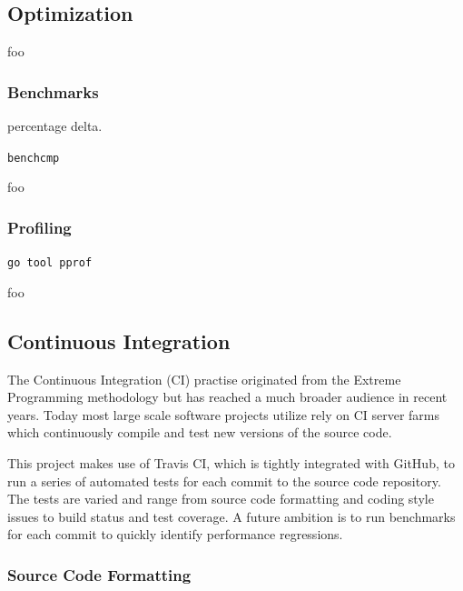 \documentclass[12pt, a4paper]{article}
\begin{document}
\subsection{Optimization}

foo

\subsubsection{Benchmarks}

percentage delta.

\texttt{benchcmp}

foo

\subsubsection{Profiling}



\texttt{go tool pprof}

foo


\subsection{Continuous Integration}

The Continuous Integration (CI) practise originated from the Extreme Programming methodology \cite{xp} but has reached a much broader audience in recent years. Today most large scale software projects utilize rely on CI server farms which continuously compile and test new versions of the source code.

This project makes use of Travis CI, which is tightly integrated with GitHub, to run a series of automated tests for each commit to the source code repository. The tests are varied and range from source code formatting and coding style issues to build status and test coverage. A future ambition is to run benchmarks for each commit to quickly identify performance regressions.


\subsubsection{Source Code Formatting}
\end{document}
